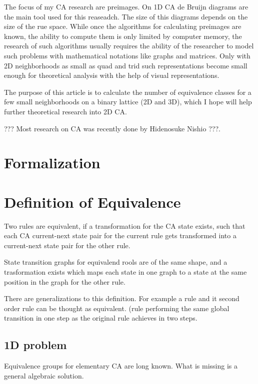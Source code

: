 \documentclass{ijuc}
\begin{document}
The focus of my CA research are preimages. On 1D CA de Bruijn diagrams are the main tool
used for this reaseadch. The size of this diagrams depends on the size of the rue space.
While once the algorithms for calculating preimages are known, the ability to compute
them is only limited by computer memory, the research of such algorithms usually requires
the ability of the researcher to model such problems with mathematical notations like
graphs and matrices. Only with 2D neighborhoods as small as quad and trid such representations
become small enough for theoretical analysis with the help of visual representations.

The purpose of this article is to calculate the number of equivalence classes for a few small
neighborhoods on a binary lattice (2D and 3D), which I hope will help further theoretical
research into 2D CA.

??? Most research on CA was recently done by Hidenosuke Nishio ???.

\section{Formalization}



\section{Definition of Equivalence}

Two rules are equivalent, if a transformation for the CA state exists, such that each CA
current-next state pair for the current rule gets transformed into a current-next state pair
for the other rule.

State transition graphs for equivalend rools are of the same shape, and a trasformation exists
which maps each state in one graph to a state at the same position in the graph for the other rule.

There are generalizations to this definition. For example a rule and it second order rule can be thought as equivalent.
(rule performing the same global transition in one step as the original rule achieves in two steps.

\subsection{1D problem}

Equivalence groups for elementary CA are long known. What is missing is a general algebraic solution.
\end{document}
